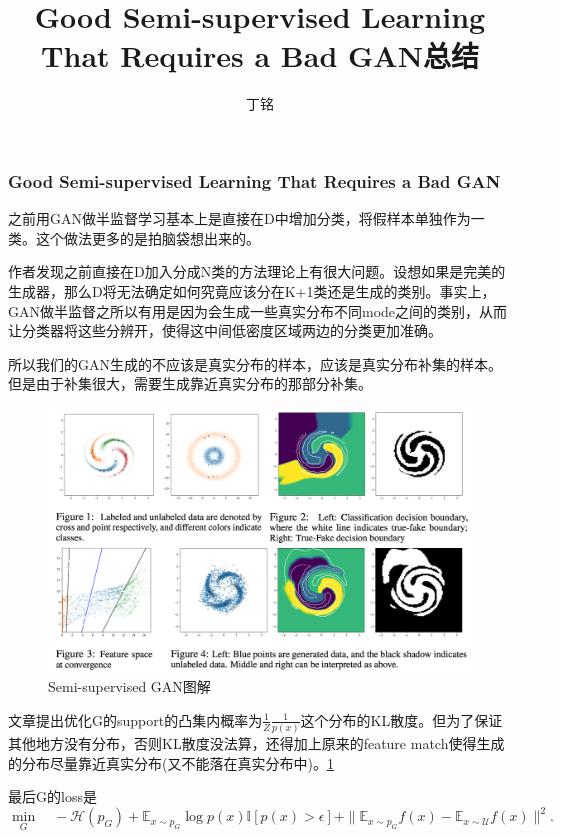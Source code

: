 \documentclass[a4paper]{article}
\title{Good Semi-supervised Learning That Requires a Bad GAN总结}
\author{丁铭}
\begin{document}
\maketitle

\subsubsection{Good Semi-supervised Learning That Requires a Bad GAN\cite{DBLP:journals/corr/DaiYYCS17}}
之前用GAN做半监督学习基本上是直接在D中增加分类，将假样本单独作为一类。这个做法更多的是拍脑袋想出来的。

作者发现之前直接在D加入分成N类的方法理论上有很大问题。设想如果是完美的生成器，那么D将无法确定如何究竟应该分在K+1类还是生成的类别。事实上，GAN做半监督之所以有用是因为会生成一些真实分布不同mode之间的类别，从而让分类器将这些分辨开，使得这中间低密度区域两边的分类更加准确。

所以我们的GAN生成的不应该是真实分布的样本，应该是真实分布补集的样本。但是由于补集很大，需要生成靠近真实分布的那部分补集。

\begin{figure}
\centering
\includegraphics[width=\textwidth]{./img/33.png}
\caption{Semi-supervised GAN图解}
\label{fig:33}
\end{figure}
文章提出优化G的support的凸集内概率为$\frac{1}{Z}\frac{1}{p(x)}$这个分布的KL散度。但为了保证其他地方没有分布，否则KL散度没法算，还得加上原来的feature match使得生成的分布尽量靠近真实分布(又不能落在真实分布中)。\ref{fig:33}

最后G的loss是$$\min_G \quad -\mathcal{H}(p_G) + \mathbb{E}_{x \sim p_G} \log p(x) \mathbb{I}[p(x) > \epsilon]  + \|\mathbb{E}_{x \sim p_G} f(x) - \mathbb{E}_{x \sim \mathcal{U}} f(x)\|^2.
$$
\end{document}
